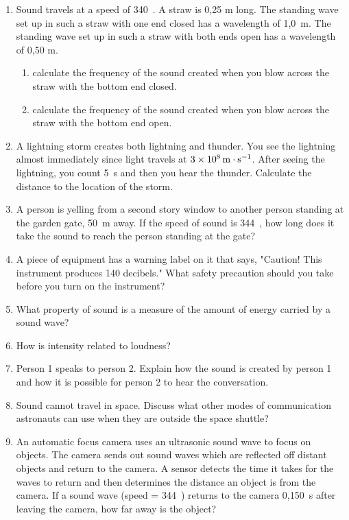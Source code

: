 \begin{eocexercises}{}
\begin{enumerate}
\renewcommand{\labelenumii}{(\alph{enumii})}

\item{Sound travels at a speed of 340~\ms. A straw is 0,25 m long. The standing wave set up in such a straw with one end closed has a wavelength of 1,0~m. The standing wave set up in such a straw with both ends open has a wavelength of 0,50 m.
\begin{enumerate}
\item calculate the frequency of the sound created when you blow across the straw with the bottom end closed.
\item calculate the frequency of the sound created when you blow across the straw with the bottom end open.
\end{enumerate}}
\item{A lightning storm creates both lightning and thunder. You see the lightning almost immediately since light travels at $3\times10^{8}\,\mathrm{m \cdot s^{-1}}$. After seeing the lightning, you count 5~s and then you hear the thunder. Calculate the distance to the location of the storm.}
\item{A person is yelling from a second story window to another person standing at the garden gate, 50~m away. If the speed of sound is 344~\ms, how long does it take the sound to reach the person standing at the gate?}
\item{A piece of equipment has a warning label on it that says, "Caution! This instrument produces 140 decibels." What safety precaution should you take before you turn on the instrument?}
\item{What property of sound is a measure of the amount of energy carried by a sound wave?}
\item{How is intensity related to loudness?}
\item Person 1 speaks to person 2. Explain how the sound is created by person 1 and how it is possible for person 2 to hear the conversation.
\item{Sound cannot travel in space. Discuss what other modes of communication astronauts can use when they are outside the space shuttle?}
\item{An automatic focus camera uses an ultrasonic sound wave to focus on objects. The camera sends out sound waves which are reflected off distant objects and return to the camera. A sensor detects the time it takes for the waves to return and then determines the distance an object is from the camera. If a sound wave (speed = 344~\ms) returns to the camera 0,150~s after leaving the camera, how far away is the object?}

\end{enumerate}
\end{eocexercises}
